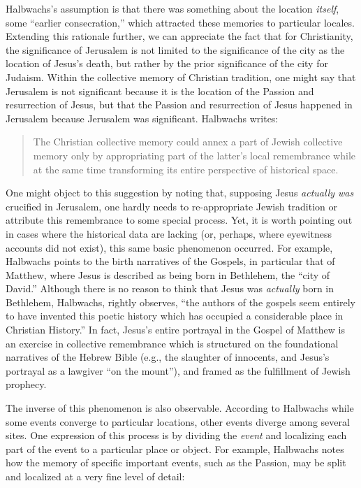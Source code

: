 Halbwachs's assumption is that there was something about the location
\emph{itself}, some ``earlier
consecration,''\autocite[220]{halbwachs1992} which attracted these
memories to particular locales. Extending this rationale further, we can
appreciate the fact that for Christianity, the significance of Jerusalem
is not limited to the significance of the city as the location of
Jesus's death, but rather by the prior significance of the city for
Judaism. Within the collective memory of Christian tradition, one might
say that Jerusalem is not significant because it is the location of the
Passion and resurrection of Jesus, but that the Passion and resurrection
of Jesus happened in Jerusalem because Jerusalem was significant.
Halbwachs writes:

\begin{quote}
The Christian collective memory could annex a part of Jewish collective
memory only by appropriating part of the latter's local remembrance
while at the same time transforming its entire perspective of historical
space.\autocite[215]{halbwachs1992}
\end{quote}

One might object to this suggestion by noting that, supposing Jesus
\emph{actually was} crucified in Jerusalem, one hardly needs to
re-appropriate Jewish tradition or attribute this remembrance to some
special process. Yet, it is worth pointing out in cases where the
historical data are lacking (or, perhaps, where eyewitness accounts did
not exist), this same basic phenomenon occurred. For example, Halbwachs
points to the birth narratives of the Gospels, in particular that of
Matthew, where Jesus is described as being born in Bethlehem, the ``city
of David.'' Although there is no reason to think that Jesus was
\emph{actually} born in Bethlehem, Halbwachs, rightly observes, ``the
authors of the gospels seem entirely to have invented this poetic
history which has occupied a considerable place in Christian
History.''\autocite[214]{halbwachs1992} In fact, Jesus's entire
portrayal in the Gospel of Matthew is an exercise in collective
remembrance which is structured on the foundational narratives of the
Hebrew Bible (e.g., the slaughter of innocents, and Jesus's portrayal as
a lawgiver ``on the mount''), and framed as the fulfillment of Jewish
prophecy.

The inverse of this phenomenon is also observable. According to
Halbwachs while some events converge to particular locations, other
events diverge among several sites. One expression of this process is by
dividing the \emph{event} and localizing each part of the event to a
particular place or object. For example, Halbwachs notes how the memory
of specific important events, such as the Passion, may be split and
localized at a very fine level of detail:

